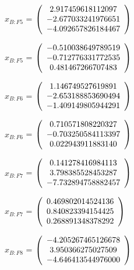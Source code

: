 \begin{description}
$x_{B:F5}$  = $\left( \begin{array} {ccc} 2.917459618112097 \\ -2.677033241976651 \\ -4.092657826184467
\end{array} \right)\\ \\$

$\hat{x}_{B:F5}$  = $\left( \begin{array} {ccc} -0.510038649789519 \\ -0.712776331772535 \\ 0.481467266707483
\end{array} \right)\\ \\$

$x_{B:F6}$  = $\left( \begin{array} {ccc} 1.146749527619891 \\ -2.653188853690494 \\ -1.409149805944291
\end{array} \right)\\ \\$

$\hat{x}_{B:F6}$  = $\left( \begin{array} {ccc} 0.710571808220327 \\ -0.703250584113397 \\ 0.022943911883140
\end{array} \right)\\ \\$

$x_{B:F7}$  = $\left( \begin{array} {ccc} 0.141278416984113 \\ 3.798385528453287 \\ -7.732894758882457
\end{array} \right)\\ \\$

$\hat{x}_{B:F7}$  = $\left( \begin{array} {ccc} 0.469802014524136 \\ 0.840823394154425 \\ 0.268891348378292
\end{array} \right)\\ \\$

$x_{B:F8}$  = $\left( \begin{array} {ccc} -4.205267465126678 \\ 3.950366275027509 \\ -4.646413544976000
\end{array} \right)\\ \\$


\end{description}
